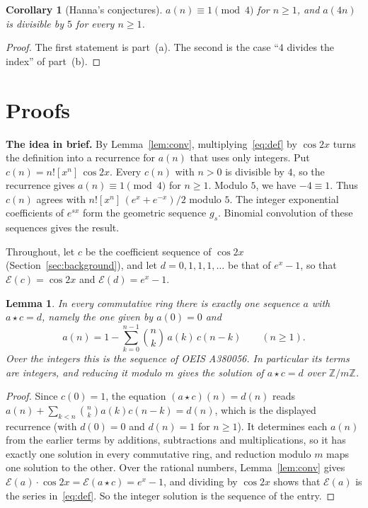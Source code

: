 \documentclass[11pt,a4paper]{article}
\newtheorem{lemma}[theorem]{Lemma}
\newtheorem{corollary}[theorem]{Corollary}
\theoremstyle{definition}
\theoremstyle{remark}
\newcommand{\Z}{\mathbb{Z}}
\newcommand{\coeff}[2]{[x^{#1}]\,#2}
\newcommand{\para}[1]{\par\medskip\noindent\textbf{#1}\enspace}
\begin{document}
\begin{corollary}[Hanna's conjectures]\label{cor:conj}
$a(n)\equiv1\pmod 4$ for $n\ge1$, and $a(4n)$ is divisible by $5$ for every $n\ge1$.
\end{corollary}

\begin{proof}
The first statement is part~(a). The second is the case ``$4$ divides the index'' of part~(b).
\end{proof}

\section{Proofs}\label{sec:proofs}

\para{The idea in brief.} By Lemma~\ref{lem:conv}, multiplying~\eqref{eq:def} by $\cos2x$ turns the definition into a
recurrence for $a(n)$ that uses only integers. Put $c(n)=n!\coeff{n}{\cos 2x}$.
Every $c(n)$ with $n>0$ is divisible by $4$, so the recurrence gives $a(n)\equiv1\pmod4$ for $n\ge1$.
Modulo $5$, we have $-4\equiv1$. Thus $c(n)$ agrees with $n!\coeff{n}{(e^x+e^{-x})/2}$ modulo $5$.
The integer exponential coefficients of $e^{sx}$ form the geometric sequence $g_s$.
Binomial convolution of these sequences gives the result.

Throughout, let $c$ be the coefficient sequence of $\cos 2x$ (Section~\ref{sec:background}), and let
$d=0,1,1,1,\dots$ be that of $e^x-1$, so that $\mathcal E(c)=\cos 2x$ and $\mathcal E(d)=e^x-1$.

\begin{lemma}\label{lem:rec}
In every commutative ring there is exactly one sequence $a$ with $a\star c=d$, namely the one given by $a(0)=0$ and
\[
a(n)=1-\sum_{k=0}^{n-1}\binom nk\,a(k)\,c(n-k)\qquad(n\ge1).
\]
Over the integers this is the sequence of OEIS A380056. In particular its terms are integers, and reducing it
modulo $m$ gives the solution of $a\star c=d$ over $\Z/m\Z$.
\end{lemma}

\begin{proof}
Since $c(0)=1$, the equation $(a\star c)(n)=d(n)$ reads $a(n)+\sum_{k<n}\binom nk a(k)c(n-k)=d(n)$, which is the
displayed recurrence (with $d(0)=0$ and $d(n)=1$ for $n\ge1$). It determines each $a(n)$ from the earlier terms by
additions, subtractions and multiplications, so it has exactly one solution in every commutative ring, and reduction
modulo $m$ maps one solution to the other. Over the rational numbers, Lemma~\ref{lem:conv} gives
$\mathcal E(a)\cdot\cos2x=\mathcal E(a\star c)=e^x-1$, and dividing by $\cos2x$ shows that $\mathcal E(a)$ is the series
in~\eqref{eq:def}. So the integer solution is the sequence of the entry.
\end{proof}
\end{document}
